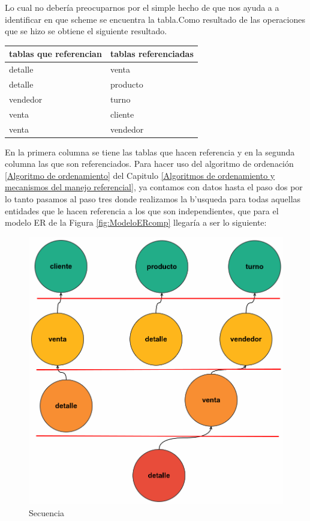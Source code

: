 Lo cual no deber\'ia preocuparnos por el simple hecho de que nos ayuda a a identificar en que scheme se encuentra la tabla.Como resultado de las operaciones que se hizo se obtiene el siguiente resultado.
\begin{center}
\scriptsize
  \renewcommand{\arrayrulewidth}{1pt}
  \label{table3} %
\begin{tabular}{|p{40mm}|p{98mm}|}
\hline
\textbf{tablas que referencian} & \textbf{tablas referenciadas} \\ \hline
detalle                         & venta                         \\ \hline
detalle                         & producto                      \\ \hline
vendedor                        & turno                         \\ \hline
venta                        & cliente                       \\ \hline
venta                           & vendedor                      \\ \hline
\end{tabular}
\end{center}
En la primera columna se tiene las tablas que hacen referencia y en la segunda columna las que son referenciados. Para hacer uso del algoritmo de ordenaci\'on \ref{Algoritmo de ordenamiento} del Capitulo \ref{Algoritmos de ordenamiento y mecanismos del manejo referencial},  ya contamos con datos hasta el paso dos por lo tanto pasamos al paso tres donde realizamos la b'usqueda para todas aquellas entidades que le hacen referencia a los que son independientes, que para el modelo ER de la Figura \ref{fig:ModeloERcomp} llegar\'ia a ser lo siguiente:
\begin{figure}[H]
\centering
\includegraphics[scale=0.2]{images/desordenadocomp.png}
\caption{Secuencia}
\end{figure}
